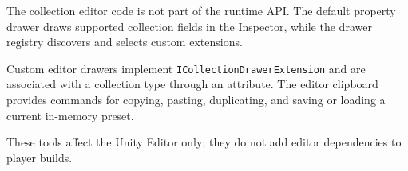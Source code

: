 The collection editor code is not part of the runtime API. The default property drawer draws supported collection fields in the Inspector, while the drawer registry discovers and selects custom extensions.

Custom editor drawers implement \texttt{ICollectionDrawerExtension} and are associated with a collection type through an attribute. The editor clipboard provides commands for copying, pasting, duplicating, and saving or loading a current in-memory preset.

These tools affect the Unity Editor only; they do not add editor dependencies to player builds.

